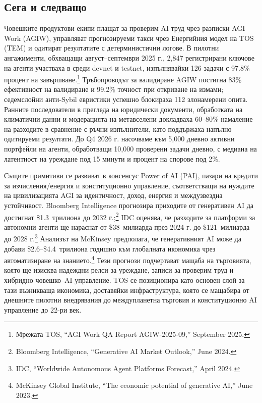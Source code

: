 \documentclass[11pt]{article}
\begin{document}
\subsection{Сега и следващо}
\begin{description}[leftmargin=2.1cm, style=nextline]
  \item[12--24 месеца] Човешките продуктови екипи плащат за проверим AI труд чрез разписки AGI Work (AGIW), управляват прогнозируеми такси чрез Енергийния модел на TOS (TEM) и одитират резултатите с детерминистични логове. В пилотни ангажименти, обхващащи август--септември 2025 г., 2,847 регистрирани ключове на агенти участваха в среди devnet и testnet, изпълнявайки 126 задачи с 97.8\% процент на завършване.\footnote{Мрежата TOS, ``AGI Work QA Report AGIW-2025-09,'' September 2025.} Тръбопроводът за валидиране AGIW постигна 83\% ефективност на валидиране и 99.2\% точност при откриване на измами; седемслойни анти-Sybil евристики успешно блокираха 112 злонамерени опита. Ранните последователи в прегледа на юридически документи, обработката на климатични данни и модерацията на метавселени докладваха 60--80\% намаление на разходите в сравнение с ръчни изпълнители, като поддържаха напълно одитируеми резултати. До Q4 2026 г. насочваме към 5,000 дневно активни портфейли на агенти, обработващи 10,000 проверени задачи дневно, с медиана на латентност на уреждане под 15 минути и процент на спорове под 2\%.

  \item[100-годишна дъга] Същите примитиви се развиват в консенсус Power of AI (PAI), пазари на кредити за изчисления/енергия и конституционно управление, съответстващи на нуждите на цивилизацията AGI за идентичност, доход, енергия и междузвездна устойчивост. Bloomberg Intelligence прогнозира приходите от генеративен AI да достигнат \$1.3~трилиона до 2032 г.;\footnote{Bloomberg Intelligence, ``Generative AI Market Outlook,'' June 2024.} IDC оценява, че разходите за платформи за автономни агенти ще нараснат от \$38~милиарда през 2024 г. до \$121~милиарда до 2028 г.\footnote{IDC, ``Worldwide Autonomous Agent Platforms Forecast,'' April 2024.} Анализът на McKinsey предполага, че генеративният AI може да добави \$2.6--\$4.4~трилиона годишно към глобалната икономика чрез автоматизиране на знанието.\footnote{McKinsey Global Institute, ``The economic potential of generative AI,'' June 2023.} Тези прогнози подчертават мащаба на търговията, която ще изисква надеждни релси за уреждане, записи за проверим труд и хибридно човешко--AI управление. TOS се позиционира като основен слой за тази възникваща икономика, доставяйки инфраструктура, която се мащабира от днешните пилотни внедрявания до междупланетна търговия и конституционно AI управление до 22-ри век.
\end{description}
\end{document}
